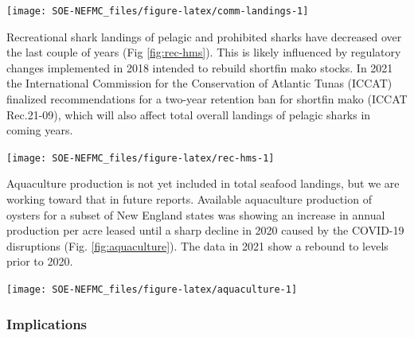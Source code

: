\documentclass[
  10pt,
]{article}
\let\origfigure\figure
\let\endorigfigure\endfigure
\renewenvironment{figure}[1][2] {
    \expandafter\origfigure\expandafter[H]
} {
    \endorigfigure
}
\begin{document}
\begin{figure}

{\centering \texttt{[image: SOE-NEFMC\_files/figure-latex/comm-landings-1]} 

}

\caption{Total commercial landings (black) and NEFMC managed U.S seafood landings (red) by feeding guild for the Gulf of Maine.}\label{fig:comm-landings}
\end{figure}

Recreational shark landings of pelagic and prohibited sharks have decreased over the last couple of years (Fig \ref{fig:rec-hms}). This is likely influenced by regulatory changes implemented in 2018 intended to rebuild shortfin mako stocks. In 2021 the International Commission for the Conservation of Atlantic Tunas (ICCAT) finalized recommendations for a two-year retention ban for shortfin mako (ICCAT Rec.21-09), which will also affect total overall landings of pelagic sharks in coming years.

\begin{figure}

{\centering \texttt{[image: SOE-NEFMC\_files/figure-latex/rec-hms-1]} 

}

\caption{Recreational shark landings from Marine Recreational Information Program.}\label{fig:rec-hms}
\end{figure}

Aquaculture production is not yet included in total seafood landings, but we are working toward that in future reports. Available aquaculture production of oysters for a subset of New England states was showing an increase in annual production per acre leased until a sharp decline in 2020 caused by the COVID-19 disruptions (Fig. \ref{fig:aquaculture}). The data in 2021 show a rebound to levels prior to 2020.

\begin{figure}

{\centering \texttt{[image: SOE-NEFMC\_files/figure-latex/aquaculture-1]} 

}

\caption{Total oyster production per acre leased for New England states.}\label{fig:aquaculture}
\end{figure}

\hypertarget{implications}{%
\subsubsection{Implications}\label{implications}}
\end{document}
